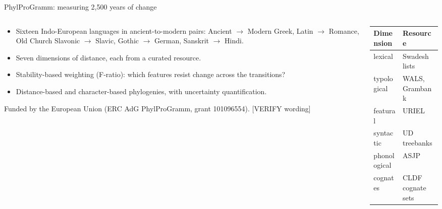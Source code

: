 \documentclass[aspectratio=169, 10pt]{beamer}
\begin{document}
\begin{frame}{PhylProGramm: measuring 2,500 years of change}
  \begin{columns}[T]
    \begin{column}{0.55\textwidth}
      \begin{itemize}
        \item Sixteen Indo-European languages in ancient-to-modern pairs: Ancient $\rightarrow$ Modern Greek, Latin $\rightarrow$ Romance, Old Church Slavonic $\rightarrow$ Slavic, Gothic $\rightarrow$ German, Sanskrit $\rightarrow$ Hindi.
        \item Seven dimensions of distance, each from a curated resource.
        \item Stability-based weighting (F-ratio): which features resist change across the transitions?
        \item Distance-based and character-based phylogenies, with uncertainty quantification.
      \end{itemize}
      \vspace{0.4em}
      \tiny Funded by the European Union (ERC AdG PhylProGramm, grant 101096554). [VERIFY wording]
    \end{column}
    \begin{column}{0.42\textwidth}
      \centering
      \small
      \begin{tabular}{ll}
        \toprule
        \textbf{Dimension} & \textbf{Resource} \\
        \midrule
        lexical & Swadesh lists \\
        typological & WALS, Grambank \\
        featural & URIEL \\
        syntactic & UD treebanks \\
        phonological & ASJP \\
        cognates & CLDF cognate sets \\
        \bottomrule
      \end{tabular}
    \end{column}
  \end{columns}
\end{frame}
\end{document}
